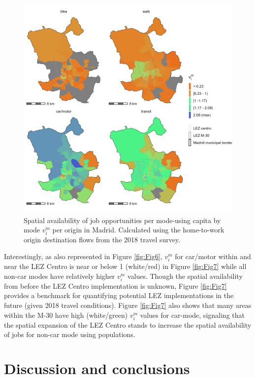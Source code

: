 \documentclass[10pt,letterpaper]{article}
\begin{document}
\begin{figure}

{\centering \includegraphics[width=1\linewidth]{images/SA_im_vv_zn208_plot} 

}

\caption{\label{fig:Fig7} Spatial availability of job opportunities per mode-using capita by mode $v_i^m$ per origin in Madrid. Calculated using the home-to-work origin destination flows from the 2018 travel survey.}\label{fig:SA-per-capita-m-plot}
\end{figure}

Interestingly, as also represented in Figure \ref{fig:Fig6}, \(v_i^m\)
for car/motor within and near the LEZ Centro is near or below 1
(white/red) in Figure \ref{fig:Fig7} while all non-car modes have
relatively higher \(v_i^m\) values. Though the spatial availability from
before the LEZ Centro implementation is unknown, Figure \ref{fig:Fig7}
provides a benchmark for quantifying potential LEZ implementations in
the future (given 2018 travel conditions). Figure \ref{fig:Fig7} also
shows that many areas within the M-30 have high (white/green) \(v_i^m\)
values for car-mode, signaling that the spatial expansion of the LEZ
Centro stands to increase the spatial availability of jobs for non-car
mode using populations.

\hypertarget{discussion-and-conclusions}{%
\section{Discussion and conclusions}\label{discussion-and-conclusions}}
\end{document}
